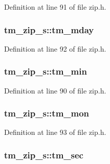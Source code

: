 Definition at line 91 of file zip.\-h.

\hypertarget{structtm__zip__s_aebc461dd0a4a7b7ebd4e00de5fbf594d}{
\subsubsection[{tm\-\_\-mday}]{ tm\-\_\-zip\-\_\-s\-::tm\-\_\-mday}}\label{structtm__zip__s_aebc461dd0a4a7b7ebd4e00de5fbf594d}


Definition at line 92 of file zip.\-h.

\hypertarget{structtm__zip__s_ad539676c1522e9f2cb77cb9e65795e2a}{
\subsubsection[{tm\-\_\-min}]{ tm\-\_\-zip\-\_\-s\-::tm\-\_\-min}}\label{structtm__zip__s_ad539676c1522e9f2cb77cb9e65795e2a}


Definition at line 90 of file zip.\-h.

\hypertarget{structtm__zip__s_ae98d11f7e2b2330b3a83efe97ffef574}{
\subsubsection[{tm\-\_\-mon}]{ tm\-\_\-zip\-\_\-s\-::tm\-\_\-mon}}\label{structtm__zip__s_ae98d11f7e2b2330b3a83efe97ffef574}


Definition at line 93 of file zip.\-h.

\hypertarget{structtm__zip__s_adf073cb37484b209d7f7f0e23275a52d}{
\subsubsection[{tm\-\_\-sec}]{ tm\-\_\-zip\-\_\-s\-::tm\-\_\-sec}}\label{structtm__zip__s_adf073cb37484b209d7f7f0e23275a52d}


